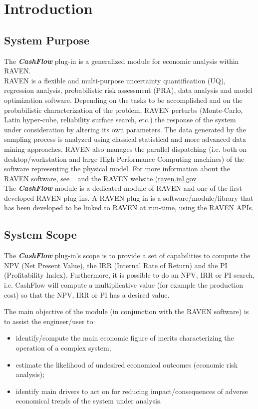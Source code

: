\section{Introduction}
\subsection{System Purpose}

The \textbf{\textit{CashFlow}} plug-in is a generalized module for economic analysis within RAVEN.
\\RAVEN is a flexible and multi-purpose uncertainty quantification (UQ), regression analysis, probabilistic risk assessment 
(PRA), data analysis and model optimization software.  Depending on the tasks to be accomplished and on the 
probabilistic
 characterization of the problem, RAVEN perturbs (Monte-Carlo, Latin hyper-cube, reliability surface search, etc.) the
 response of the system under consideration by altering its own parameters. 
 The data generated by the sampling process is analyzed using classical statistical
 and more advanced data mining approaches. RAVEN also manages the parallel dispatching (i.e. both on
 desktop/workstation and large High-Performance Computing machines) of the software representing the physical 
 model.
 For more information about the RAVEN software, see ~\cite{RAVENuserManual} and the RAVEN website (\url{raven.inl.gov}
\\The  \textbf{\textit{CashFlow}} module is a dedicated module of RAVEN and one of the first developed RAVEN plug-ins. 
A RAVEN plug-in is a software/module/library that has been developed to be linked to RAVEN at run-time, using the RAVEN APIs.


\subsection{System Scope}

The \textbf{\textit{CashFlow}} plug-in’s scope is to provide a set of capabilities to compute the NPV (Net Present Value), the IRR 
(Internal Rate of Return) and the PI (Profitability Index). Furthermore, it is possible to do an NPV, IRR or PI search, i.e. CashFlow will 
compute a multiplicative value (for example the production cost) so that the NPV, IRR or PI has a desired value.

 The main objective of the module (in conjunction with the RAVEN software) is to assist the engineer/user to:
\begin{itemize}
  \item identify/compute the main economic figure of merits characterizing the operation of a complex system;
  \item estimate the likelihood of undesired economical outcomes (economic risk analysis);
  \item identify main drivers to act on for reducing impact/consequences of adverse economical trends of the 
         system under analysis.
\end{itemize}

